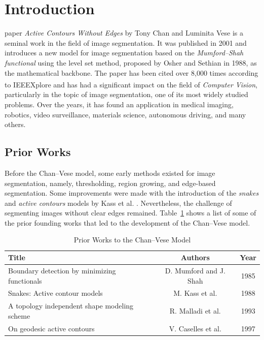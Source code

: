 \documentclass[journal]{IEEEtran}
\begin{document}
\section{Introduction}
 paper \emph{Active Contours Without Edges} by Tony Chan and Luminita Vese \cite{ChanVese} is a seminal work in the field of image segmentation. It was published in 2001 and introduces a new model for image segmentation based on the \emph{Mumford--Shah functional} \cite{MumfordShah} using the level set method, proposed by Osher and Sethian \cite{Osher1988} in 1988, as the mathematical backbone. The paper has been cited over 8,000 times according to IEEEXplore\textsuperscript{\textregistered} and has had a significant impact on the field of \emph{Computer Vision}, particularly in the topic of image segmentation, one of its most widely studied problems. Over the years, it has found an application in medical imaging, robotics, video surveillance, materials science, autonomous driving, and many others.

\subsection{Prior Works}
\noindent Before the Chan--Vese model, some early methods existed for image segmentation, namely, thresholding, region growing, and edge-based segmentation. Some improvements were made with the introduction of the \emph{snakes} and \emph{active contours} models by Kass et al. \cite{Kass1988}. Nevertheless, the challenge of segmenting images without clear edges remained. Table~\ref{tab1:key-papers} shows a list of some of the prior founding works that led to the development of the Chan--Vese model.

\begin{table}[h]
    \begin{center}
        \caption{Prior Works to the Chan--Vese Model}
        \label{tab1:key-papers}
        \begin{tabular}{| p{} c c |}
            \hline
            \textbf{Title}                                                  & \textbf{Authors}       & \textbf{Year} \\
            \hline
            Boundary detection by minimizing functionals \cite{MumfordShah} & D. Mumford and J. Shah & 1985          \\
            \hline
            Snakes: Active contour models \cite{Kass1988}                   & M. Kass et al.         & 1988          \\
            \hline
            A topology independent shape modeling scheme \cite{Malladi1993} & R. Malladi et al.      & 1993          \\
            \hline
            On geodesic active contours \cite{Caselles}                     & V. Caselles et al.     & 1997          \\
            \hline
        \end{tabular}
    \end{center}
\end{table}
\end{document}
